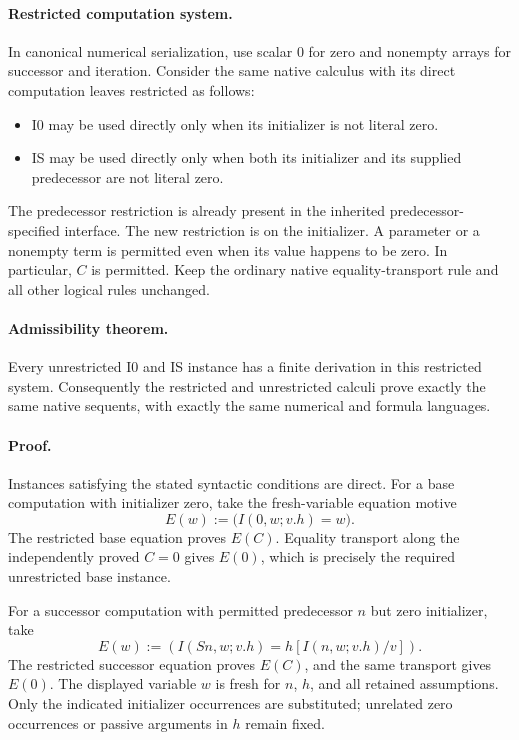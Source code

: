 \documentclass[11pt,letterpaper]{article}
\theoremstyle{definition}\newtheorem{definition}[theorem]{Definition}
\theoremstyle{remark}\newtheorem{remark}[theorem]{Remark}
\begin{document}
\paragraph{Restricted computation system.}
In canonical numerical serialization, use scalar $0$ for zero and
nonempty arrays for successor and iteration.  Consider the same native
calculus with its direct computation leaves restricted as follows:

\begin{itemize}
\item I0 may be used directly only when its initializer is not literal
  zero.
\item IS may be used directly only when both its initializer and its
  supplied predecessor are not literal zero.
\end{itemize}

The predecessor restriction is already present in the inherited
predecessor-specified interface.  The new restriction is on the
initializer.  A parameter or a nonempty term is permitted even when its
value happens to be zero.  In particular, $C$ is permitted.  Keep the
ordinary native equality-transport rule and all other logical rules
unchanged.

\paragraph{Admissibility theorem.}
Every unrestricted I0 and IS instance has a finite derivation in this
restricted system.  Consequently the restricted and unrestricted
calculi prove exactly the same native sequents, with exactly the same
numerical and formula languages.

\paragraph{Proof.}
Instances satisfying the stated syntactic conditions are direct.
For a base computation with initializer zero, take the fresh-variable
equation motive
\[
                  E(w):=\bigl(I(0,w;v.h)=w\bigr).
\]
The restricted base equation proves $E(C)$.  Equality transport along
the independently proved $C=0$ gives $E(0)$, which is precisely the
required unrestricted base instance.

For a successor computation with permitted predecessor $n$ but zero
initializer, take
\[
 E(w):=\left(I(Sn,w;v.h)=h[I(n,w;v.h)/v]\right).
\]
The restricted successor equation proves $E(C)$, and the same transport
gives $E(0)$.  The displayed variable $w$ is fresh for $n$, $h$, and all
retained assumptions.  Only the indicated initializer occurrences are
substituted; unrelated zero occurrences or passive arguments in $h$
remain fixed.
\end{document}
